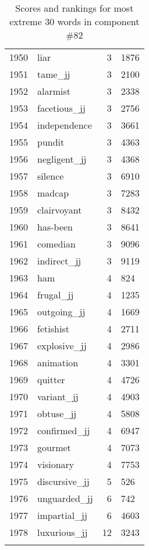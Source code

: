 \begin{longtable}[!htbp]{| rlr@{.}l |}
    1950 & liar & 3 & 1876 \\
    1951 & tame\_jj & 3 & 2100 \\
    1952 & alarmist & 3 & 2338 \\
    1953 & facetious\_jj & 3 & 2756 \\
    1954 & independence & 3 & 3661 \\
    1955 & pundit & 3 & 4363 \\
    1956 & negligent\_jj & 3 & 4368 \\
    1957 & silence & 3 & 6910 \\
    1958 & madcap & 3 & 7283 \\
    1959 & clairvoyant & 3 & 8432 \\
    1960 & has-been & 3 & 8641 \\
    1961 & comedian & 3 & 9096 \\
    1962 & indirect\_jj & 3 & 9119 \\
    1963 & ham & 4 & 824 \\
    1964 & frugal\_jj & 4 & 1235 \\
    1965 & outgoing\_jj & 4 & 1669 \\
    1966 & fetishist & 4 & 2711 \\
    1967 & explosive\_jj & 4 & 2986 \\
    1968 & animation & 4 & 3301 \\
    1969 & quitter & 4 & 4726 \\
    1970 & variant\_jj & 4 & 4903 \\
    1971 & obtuse\_jj & 4 & 5808 \\
    1972 & confirmed\_jj & 4 & 6947 \\
    1973 & gourmet & 4 & 7073 \\
    1974 & visionary & 4 & 7753 \\
    1975 & discursive\_jj & 5 & 526 \\
    1976 & unguarded\_jj & 6 & 742 \\
    1977 & impartial\_jj & 6 & 4603 \\
    1978 & luxurious\_jj & 12 & 3243 \\
    \hline
    \caption{Scores and rankings for most extreme 30 words in component \#82} \\
\end{longtable}
